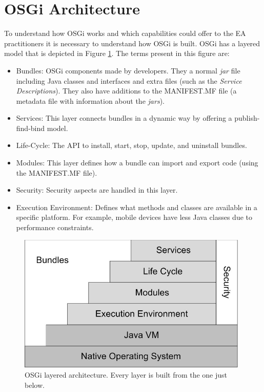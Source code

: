 \label{chap:appendixosgi}
\minitoc\mtcskip
\vfill
\section{OSGi Architecture}
To understand how OSGi \cite{Moussa2010Composition} works and which capabilities could offer to the EA practitioners it is necessary to understand how OSGi is built. OSGi has a layered model that is depicted in Figure \ref{fig:osgi-original}. The terms present in this figure are:

\begin{itemize}
\item Bundles: OSGi components made by developers. They a normal {\em jar} file including Java classes and interfaces and extra files (such as the {\em Service Descriptions}). They also have additions to the MANIFEST.MF file (a metadata file with information about the {\em jars}).
\item Services: This layer connects bundles in a dynamic way by offering a publish-find-bind model.
\item Life-Cycle: The API to install, start, stop, update, and uninstall bundles.
\item Modules: This layer defines how a bundle can import and export code (using the MANIFEST.MF file).
\item Security: Security aspects are handled in this layer.
\item Execution Environment: Defines what methods and classes are available in a specific platform. For example, mobile devices have less Java classes due to performance constraints.
\end{itemize}

\begin{figure}
\centering
\includegraphics[width=26pc]{gfx/soa/osgi-oficial.jpg}
\caption{OSGi layered architecture. Every layer is built from the one just below.}
\label{fig:osgi-original}
\end{figure}






